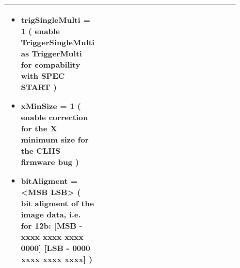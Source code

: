 \documentclass[letterpaper,10pt,english]{sphinxmanual}
\begin{document}
\begin{tabular}{|p{0.237\linewidth}|p{0.237\linewidth}|p{0.237\linewidth}|p{0.237\linewidth}|}
\begin{description}
\begin{itemize}
\item {} 
trigSingleMulti = 1
(
enable TriggerSingleMulti as TriggerMulti for compability
with SPEC START
)

\item {} 
xMinSize = 1
(
enable correction for the X minimum size for the CLHS firmware bug
)

\item {} 
bitAligment = \textless{}MSB \textbar{} LSB\textgreater{}
(
bit aligment of the image data, i.e. for 12b:
{[}MSB - xxxx xxxx xxxx 0000{]}
{[}LSB - 0000 xxxx xxxx xxxx{]}
)

\end{itemize}

\end{description}
\\
\hline\end{tabular}
\end{document}
